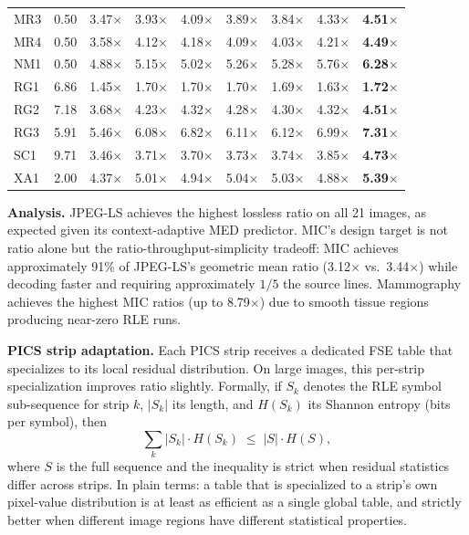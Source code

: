 \documentclass[journal]{IEEEtran}
\begin{document}
\begin{table}[t]
\begin{tabular}{lrrrrrrrr}
MR3  & 0.50 & 3.47$\times$ & 3.93$\times$ & 4.09$\times$ & 3.89$\times$ & 3.84$\times$ & 4.33$\times$ & \textbf{4.51$\times$} \\
MR4  & 0.50 & 3.58$\times$ & 4.12$\times$ & 4.18$\times$ & 4.09$\times$ & 4.03$\times$ & 4.21$\times$ & \textbf{4.49$\times$} \\
NM1  & 0.50 & 4.88$\times$ & 5.15$\times$ & 5.02$\times$ & 5.26$\times$ & 5.28$\times$ & 5.76$\times$ & \textbf{6.28$\times$} \\
RG1  & 6.86 & 1.45$\times$ & 1.70$\times$ & 1.70$\times$ & 1.70$\times$ & 1.69$\times$ & 1.63$\times$ & \textbf{1.72$\times$} \\
RG2  & 7.18 & 3.68$\times$ & 4.23$\times$ & 4.32$\times$ & 4.28$\times$ & 4.30$\times$ & 4.32$\times$ & \textbf{4.51$\times$} \\
RG3  & 5.91 & 5.46$\times$ & 6.08$\times$ & 6.82$\times$ & 6.11$\times$ & 6.12$\times$ & 6.99$\times$ & \textbf{7.31$\times$} \\
SC1  & 9.71 & 3.46$\times$ & 3.71$\times$ & 3.70$\times$ & 3.73$\times$ & 3.74$\times$ & 3.85$\times$ & \textbf{4.73$\times$} \\
XA1  & 2.00 & 4.37$\times$ & 5.01$\times$ & 4.94$\times$ & 5.04$\times$ & 5.03$\times$ & 4.88$\times$ & \textbf{5.39$\times$} \\
\bottomrule
\end{tabular}
\end{table}


\textbf{Analysis.} JPEG-LS achieves the highest lossless ratio on all 21
images, as expected given its context-adaptive MED predictor. MIC's design
target is not ratio alone but the ratio-throughput-simplicity tradeoff: MIC
achieves approximately 91\% of JPEG-LS's geometric mean ratio
(3.12$\times$ vs.\ 3.44$\times$) while decoding faster and requiring
approximately $1/5$ the source lines. Mammography achieves the highest MIC
ratios (up to 8.79$\times$) due to smooth tissue regions producing near-zero
RLE runs.

\textbf{PICS strip adaptation.} Each PICS strip receives a dedicated FSE table
that specializes to its local residual distribution. On large images, this
per-strip specialization improves ratio slightly. Formally, if $S_k$ denotes
the RLE symbol sub-sequence for strip $k$, $|S_k|$ its length, and $H(S_k)$
its Shannon entropy (bits per symbol), then
\begin{equation}
  \sum_k |S_k| \cdot H(S_k) \;\leq\; |S| \cdot H(S),
\end{equation}
where $S$ is the full sequence and the inequality is strict when residual
statistics differ across strips. In plain terms: a table that is specialized
to a strip's own pixel-value distribution is at least as efficient as a single
global table, and strictly better when different image regions have different
statistical properties.
\end{document}
